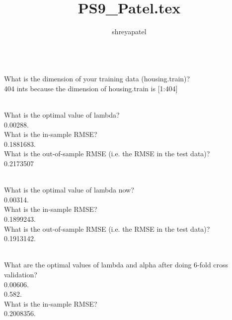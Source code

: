 \documentclass{article}
\title{PS9_Patel.tex}
\author{shreyapatel }
\begin{document}
\\
What is the dimension of your training data (housing.train)?\\
404 ints because the dimension of housing.train is [1:404]
\newline

\\
What is the optimal value of lambda?\\
0.00288.\\

What is the in-sample RMSE?\\
0.1881683.\\

What is the out-of-sample RMSE (i.e. the RMSE in the test data)?\\
0.2173507
\newline

\\
What is the optimal value of lambda now?\\
0.00314.\\

What is the in-sample RMSE?\\
0.1899243.\\

What is the out-of-sample RMSE (i.e. the RMSE in the test data)?\\
0.1913142.
\newline

\\
What are the optimal values of lambda and alpha after doing 6-fold cross validation?\\
0.00606.\\
0.582.\\

What is the in-sample RMSE?\\
0.2008356.\\
\end{document}
